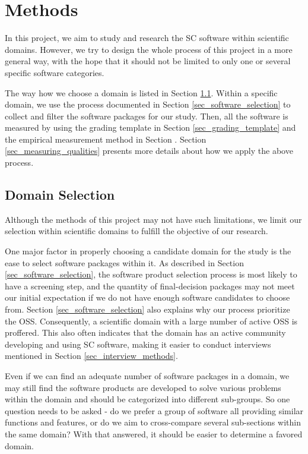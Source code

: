 \chapter{Methods}
\label{ch_methods}


In this project, we aim to study and research the SC software within scientific domains. However, we try to design the whole process of this project in a more general way, with the hope that it should not be limited to only one or several specific software categories.

The way how we choose a domain is listed in Section \ref{sec_domain_selection}. Within a specific domain, we use the process documented in Section \ref{sec_software_selection} to collect and filter the software packages for our study. Then, all the software is measured by using the grading template in Section \ref{sec_grading_template} and the empirical measurement method in Section \label{sec_empirical_measurements}. Section \ref{sec_measuring_qualities} presents more details about how we apply the above process.

\section{Domain Selection}
\label{sec_domain_selection}
Although the methods of this project may not have such limitations, we limit our selection within scientific domains to fulfill the objective of our research.

One major factor in properly choosing a candidate domain for the study is the ease to select software packages within it. As described in Section \ref{sec_software_selection}, the software product selection process is most likely to have a screening step, and the quantity of final-decision packages may not meet our initial expectation if we do not have enough software candidates to choose from. Section \ref{sec_software_selection} also explains why our process prioritize the OSS. Consequently, a scientific domain with a large number of active OSS is proffered. This also often indicates that the domain has an active community developing and using SC software, making it easier to conduct interviews mentioned in Section \ref{sec_interview_methods}.

Even if we can find an adequate number of software packages in a domain, we may still find the software products are developed to solve various problems within the domain and should be categorized into different sub-groups. So one question needs to be asked - do we prefer a group of software all providing similar functions and features, or do we aim to cross-compare several sub-sections within the same domain? With that answered, it should be easier to determine a favored domain.

